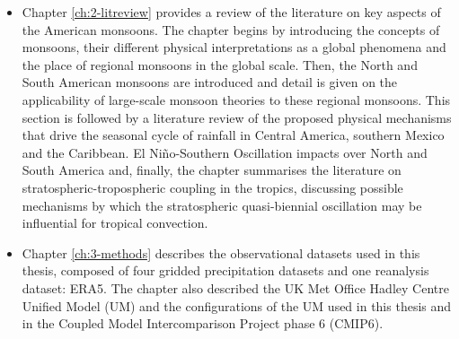 \begin{itemize}
\item Chapter \ref{ch:2-litreview} provides a review of the literature on key aspects of the American monsoons. The chapter begins by introducing the concepts of monsoons, their different physical interpretations as a global phenomena and the place of regional monsoons in the global scale. Then, the North and South American monsoons are introduced and detail is given on the applicability of large-scale monsoon theories to these regional monsoons. This section is followed by a literature review of the proposed physical mechanisms that drive the seasonal cycle of rainfall in Central America, southern Mexico and the Caribbean. El Niño-Southern Oscillation  impacts over North and South America and, finally, the chapter summarises the literature on stratospheric-tropospheric coupling in the tropics, discussing possible mechanisms by which the stratospheric quasi-biennial oscillation may be influential for tropical convection. 

\item  Chapter \ref{ch:3-methods} describes the observational datasets used in this thesis, composed of four gridded precipitation datasets and one reanalysis dataset: ERA5. The chapter also described the UK Met Office Hadley Centre Unified Model (UM) and the configurations of the UM used in this thesis and in the Coupled Model Intercomparison Project phase 6 (CMIP6). 


\end{itemize}
